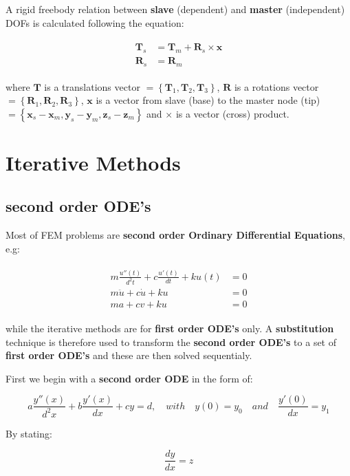 \documentclass[10pt,b5paper,titlepage]{book}
\newcommand{\m}{\mathbf}
\newenvironment{eqarray}
{
    \begin{eqnarray}
        \begin{aligned}
}
{
        \end{aligned}
    \end{eqnarray}
}
\begin{document}
A rigid freebody relation between \textbf{slave} (dependent) and \textbf{master}
(independent) DOFs is calculated following the equation:

\begin{eqarray}\label{freebody-master-slave}
    \m{T}_s &= \m{T}_m + \m{R}_s \times \m{x}\\
    \m{R}_s &= \m{R}_m
\end{eqarray}

where
$ \m{T} $ is a translations vector
$ = \left\{ \m{T}_1, \m{T}_2,  \m{T}_3 \right\} $,
$ \m{R} $ is a rotations vector
$ = \left\{ \m{R}_1, \m{R}_2,  \m{R}_3 \right\} $,
$ \m{x} $ is a vector from slave (base) to the master node (tip)
$ = \left\{ \m{x}_s - \m{x}_m,  \m{y}_s - \m{y}_m,
\m{z}_s - \m{z}_m \right\} $ and
$ \times $ is a vector (cross) product.



\chapter{Iterative Methods}

\section{second order ODE's}

Most of FEM problems are \textbf{second order Ordinary Differential Equations}, e.g:

\begin{eqarray}
    m \frac{u''(t)}{d^2 t} + c \frac{u'(t)}{dt} + k u(t) &= 0\\
    m \ddot{u} + c \dot{u} + k u &= 0\\
    m a + c v + ku &= 0
\end{eqarray}

while the iterative methods are for \textbf{first order ODE's} only.
A \textbf{substitution} technique is therefore used to transform the
\textbf{second order ODE's} to a set of \textbf{first order ODE's} and these are
then solved sequentialy.

First we begin with a \textbf{second order ODE} in the form of:

\begin{equation}
    a \frac{y''(x)}{d^2 x} + b \frac{y'(x)}{dx} + c y = d, \quad with \quad y(0) = y_0 \quad and \quad
    \frac{y'(0)}{dx} = y_1
\end{equation}

By stating:

\begin{equation}
    \frac{dy}{dx} = z
\end{equation}
\end{document}
